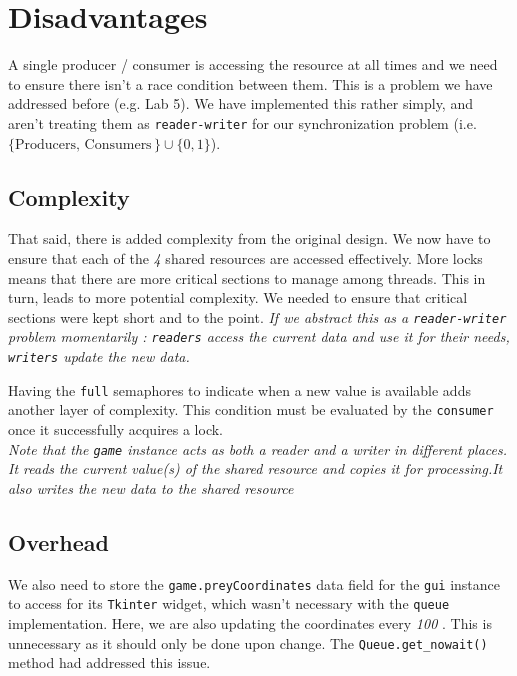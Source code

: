 \documentclass{article}
\begin{document}
\section{Disadvantages}

A single producer / consumer is accessing the resource at all times and we need to ensure there isn't a race condition between them. This is a problem we have addressed before (e.g. Lab 5).
We have implemented this rather simply, and aren't treating them as \texttt{reader-writer} for our synchronization problem (i.e. \( \{ \text{Producers, Consumers}\, \} \cup \{ 0, 1 \} \)).

\subsection{Complexity}

That said, there is added complexity from the original design. We now have to ensure that each of the \textit{4} shared resources are accessed effectively. More locks means that there are more critical sections to manage among threads.
This in turn, leads to more potential complexity. We needed to ensure that critical sections were kept short and to the point.
\textit{If we abstract this as a \texttt{reader-writer} problem momentarily : \texttt{readers} access the current data and use it for their needs, \texttt{writers} update the new data.}

Having the \texttt{full} semaphores to indicate when a new value is available adds another layer of complexity. This condition must be evaluated by the \texttt{consumer} once it successfully acquires a lock. \\

\textit{Note that the \texttt{game} instance acts as both a reader and a writer in different places. It reads the current value(s) of the shared resource and copies it for processing.It also writes the new data to the shared resource} \\

\subsection{Overhead}

We also need to store the \texttt{game.preyCoordinates} data field for the \texttt{gui} instance to access for its \texttt{Tkinter} widget, which wasn't necessary with the \texttt{queue} implementation.
Here, we are also updating the coordinates every \textit{100\,\,}. This is unnecessary as it should only be done upon change. The \texttt{Queue.get\_nowait()} method had addressed this issue.
\end{document}
